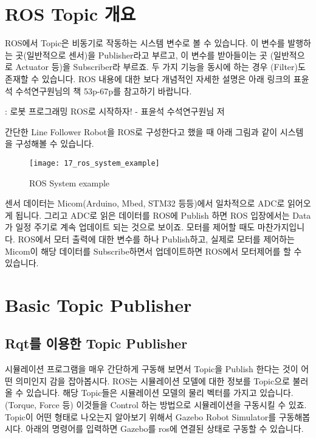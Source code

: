 \documentclass[11pt,fleqn]{book} %
\begin{document}
\section{ROS Topic 개요}

ROS에서 Topic은 비동기로 작동하는 시스템 변수로 볼 수 있습니다. 이 변수를 발행하는 곳(일반적으로 센서)을 Publisher라고 부르고,
이 변수를 받아들이는 곳 (일반적으로 Actuator 등)을 Subscriber라 부르죠. 두 가지 기능을 동시에 하는 경우 (Filter)도 존재할 수 있습니다.
ROS 내용에 대한 보다 개념적인 자세한 설명은 아래 링크의 표윤석 수석연구원님의 책 53p-67p를 참고하기 바랍니다.

\begin{link}
  : 로봇 프로그래밍 ROS로 시작하자! - 표윤석 수석연구원님 저
\end{link}

간단한 Line Follower Robot을 ROS로 구성한다고 했을 때 아래 그림과 같이 시스템을 구성해볼 수 있습니다.

\begin{figure}[h]
\centering\texttt{[image: 17\_ros\_system\_example]}
\caption{ROS System example}
\end{figure}

센서 데이터는 Micom(Arduino, Mbed, STM32 등등)에서 일차적으로 ADC로 읽어오게 됩니다. 그리고 ADC로 읽은 데이터를 ROS에 Publish 하면 ROS 입장에서는 Data가 일정 주기로 계속 업데이트 되는 것으로 보이죠.
모터를 제어할 때도 마찬가지입니다. ROS에서 모터 출력에 대한 변수를 하나 Publish하고, 실제로 모터를 제어하는 Micom이 해당 데이터를 Subscribe하면서 업데이트하면 ROS에서 모터제어를 할 수 있습니다.

\section{Basic Topic Publisher}

\subsection{Rqt를 이용한 Topic Publisher}

시뮬레이션 프로그램을 매우 간단하게 구동해 보면서 Topic을 Publish 한다는 것이 어떤 의미인지 감을 잡아봅시다. ROS는 시뮬레이션 모델에 대한 정보를 Topic으로 불러올 수 있습니다.
해당 Topic들은 시뮬레이션 모델의 물리 벡터를 가지고 있습니다.(Torque, Force 등)
이것들을 Control 하는 방법으로 시뮬레이션을 구동시킬 수 있죠. Topic이 어떤 형태로 나오는지 알아보기 위해서 Gazebo Robot Simulator를 구동해봅시다.
아래의 명령어를 입력하면 Gazebo를 ros에 연결된 상태로 구동할 수 있습니다.
\end{document}
